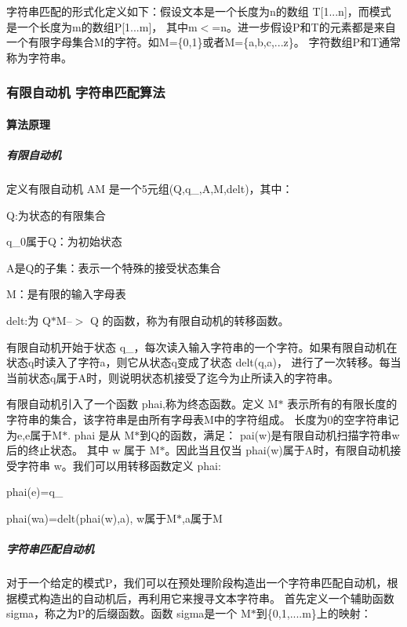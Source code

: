字符串匹配的形式化定义如下：假设文本是一个长度为n的数组 T\mbox{[}1...n\mbox{]}，而模式是一个长度为m的数组\+P\mbox{[}1...m\mbox{]}， 其中m$<$=n。进一步假设\+P和\+T的元素都是来自一个有限字母集合\+M的字符。如\+M=\{0,1\}或者\+M=\{a,b,c,...z\}。 字符数组\+P和\+T通常称为字符串。

\subsubsection*{有限自动机 字符串匹配算法}

\paragraph*{算法原理}

\subparagraph*{有限自动机}

定义有限自动机 A\+M 是一个5元组(\+Q,q\+\_,\+A,\+M,delt)，其中：


\begin{DoxyItemize}
\item Q\+:为状态的有限集合
\item q\+\_\+0属于\+Q：为初始状态
\item A是\+Q的子集：表示一个特殊的接受状态集合
\item M：是有限的输入字母表
\item delt\+:为 Q$\ast$\+M--$>$ Q 的函数，称为有限自动机的转移函数。
\end{DoxyItemize}

有限自动机开始于状态 q\+\_，每次读入输入字符串的一个字符。如果有限自动机在状态q时读入了字符a，则它从状态q变成了状态 delt(q,a)， 进行了一次转移。每当当前状态q属于\+A时，则说明状态机接受了迄今为止所读入的字符串。

有限自动机引入了一个函数 phai,称为终态函数。定义 M$\ast$ 表示所有的有限长度的字符串的集合，该字符串是由所有字母表\+M中的字符组成。 长度为0的空字符串记为e,e属于\+M$\ast$. phai 是从 M$\ast$到\+Q的函数，满足： pai(w)是有限自动机扫描字符串w后的终止状态。 其中 w 属于 M$\ast$。因此当且仅当 phai(w)属于\+A时，有限自动机接受字符串 w。我们可以用转移函数定义 phai\+:


\begin{DoxyItemize}
\item phai(e)=q\+\_
\item phai(wa)=delt(phai(w),a), w属于\+M$\ast$,a属于\+M
\end{DoxyItemize}

\subparagraph*{字符串匹配自动机}

对于一个给定的模式\+P，我们可以在预处理阶段构造出一个字符串匹配自动机，根据模式构造出的自动机后，再利用它来搜寻文本字符串。 首先定义一个辅助函数 sigma，称之为\+P的后缀函数。函数 sigma是一个 M$\ast$到\{0,1,....m\}上的映射：


